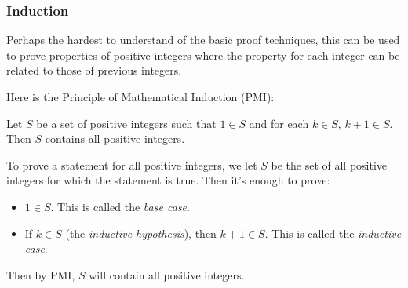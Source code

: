 \documentclass{amsart}
\begin{document}
\subsubsection{Induction}
Perhaps the hardest to understand of the basic proof techniques, this can be
used to prove properties of positive integers where the property for each
integer can be related to those of previous integers.

Here is the Principle of Mathematical Induction (PMI):
\begin{tcolorbox}
  Let $S$ be a set of positive integers such that $1\in S$ and for each $k\in S$,
  $k+1\in S$. Then $S$ contains all positive integers.
\end{tcolorbox}

To prove a statement for all positive integers, we let $S$ be the set of all
positive integers for which the statement is true. Then it's enough to prove:
\begin{itemize}
  \item $1\in S$. This is called the \emph{base case}.
  \item If $k\in S$ (the \emph{inductive hypothesis}), then $k+1\in S$. This is
    called the \emph{inductive case}.
\end{itemize}
Then by PMI, $S$ will contain all positive integers.
\end{document}
